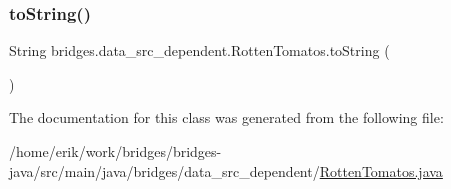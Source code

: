 \subsubsection{\texorpdfstring{to\+String()}{toString()}}
{\footnotesize\ttfamily String bridges.\+data\+\_\+src\+\_\+dependent.\+Rotten\+Tomatos.\+to\+String (\begin{DoxyParamCaption}{ }\end{DoxyParamCaption})}



The documentation for this class was generated from the following file\+:\begin{DoxyCompactItemize}
\item 
/home/erik/work/bridges/bridges-\/java/src/main/java/bridges/data\+\_\+src\+\_\+dependent/\hyperlink{_rotten_tomatos_8java}{Rotten\+Tomatos.\+java}\end{DoxyCompactItemize}
